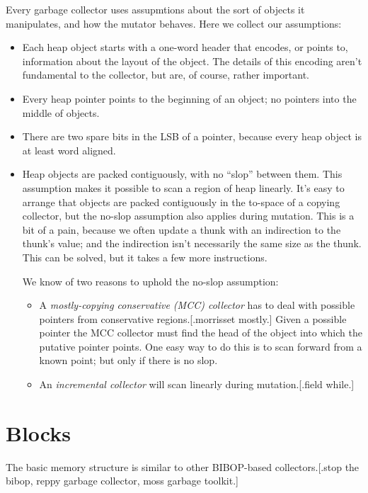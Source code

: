 \documentclass{article}
\newcommand{\Block}{Block}
\begin{document}
Every garbage collector uses assupmtions about the sort of
objects it manipulates, and how the mutator behaves.  Here we
collect our assumptions:
\begin{itemize}
\item Each heap object starts with a one-word header that encodes, or points
to, information about the layout of the object.  The details of this
encoding aren't fundamental to the collector, but are, of course, rather 
important.

\item Every heap pointer points to the beginning of
an object; no pointers into the middle of objects.

\item There are two spare bits in the LSB of a pointer, because
every heap object is at least word aligned.

\item
Heap objects are packed contiguously, with no ``slop'' between them.
This assumption makes it possible to scan a region of heap linearly.
It's easy to arrange that objects are packed contiguously in the
to-space of a copying collector, but the no-slop assumption also
applies during mutation.  This is a bit of a pain, because we often
update a thunk with an indirection to the thunk's value; and the
indirection isn't necessarily the same size as the thunk.  This can be
solved, but it takes a few more instructions.

We know of two reasons to uphold the no-slop assumption:
\begin{itemize}
\item A {\em mostly-copying conservative (MCC) collector} has to deal with 
possible pointers from conservative regions.[.morrisset mostly.]
Given a possible pointer the MCC collector must find the head of the object into
which the putative pointer points.  One easy way to do this is
to scan forward from a known point; but only if there is no
slop.
\item An {\em incremental collector}
will scan linearly during mutation.[.field while.]
\end{itemize}
\end{itemize}


\section{\Block{}s}

The basic memory structure is similar to other BIBOP-based 
collectors.[.stop the bibop, reppy garbage collector, moss garbage toolkit.]
\end{document}

